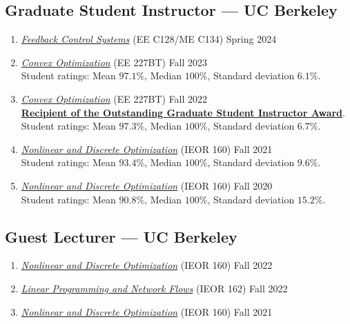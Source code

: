 \documentclass[11pt]{article}
\newcommand{\subsectionskip}{\baselineskip}	%
\newcommand{\cvdate}[1]{\hfill#1}			%
\begin{document}
	\subsection{Graduate Student Instructor --- UC Berkeley}
	\begin{enumerate}[label={\arabic*.}]
		\item \href{https://people.eecs.berkeley.edu/~sojoudi/Course_EE128_SP_2024.html}{\textit{Feedback Control Systems}} (EE C128/ME C134) \cvdate{Spring 2024}
		\item \href{https://classes.berkeley.edu/content/2023-fall-eleng-227bt-001-lec-001}{\textit{Convex Optimization}} (EE 227BT) \cvdate{Fall 2023} \\
		Student ratings: Mean $97.1\%$, Median $100\%$, Standard deviation $6.1\%$.
		\item \href{https://classes.berkeley.edu/content/2022-fall-eleng-227bt-001-lec-001}{\textit{Convex Optimization}} (EE 227BT) \cvdate{Fall 2022} \\
		\textbf{\href{https://gsi.berkeley.edu/programs-services/award-programs/ogsi/ogsi-recipients-2022-2023/}{Recipient of the Outstanding Graduate Student Instructor Award}}. \\
		Student ratings: Mean $97.3\%$, Median $100\%$, Standard deviation $6.7\%$.
		\item \href{https://lavaei.ieor.berkeley.edu/Course_IEOR160_Fall_2021.html}{\textit{Nonlinear and Discrete Optimization}} (IEOR 160) \cvdate{Fall 2021} \\
		Student ratings: Mean $93.4\%$, Median $100\%$, Standard deviation $9.6\%$.
		\item \href{https://lavaei.ieor.berkeley.edu/Course_IEOR160_Fall_2020.html}{\textit{Nonlinear and Discrete Optimization}} (IEOR 160) \cvdate{Fall 2020} \\
		Student ratings: Mean $90.8\%$, Median $100\%$, Standard deviation $15.2\%$.
	\end{enumerate}
	
	\vspace*{\subsectionskip}

	\subsection{Guest Lecturer --- UC Berkeley}

	\begin{enumerate}[label={\arabic*.}]
		\item \href{https://lavaei.ieor.berkeley.edu/Course_IEOR160_Fall_2022.html}{\textit{Nonlinear and Discrete Optimization}} (IEOR 160) \cvdate{Fall 2022}
		\item \href{https://lavaei.ieor.berkeley.edu/Course_IEOR162_Fall_2022.html}{\textit{Linear Programming and Network Flows}} (IEOR 162) \cvdate{Fall 2022}
		\item \href{https://lavaei.ieor.berkeley.edu/Course_IEOR160_Fall_2021.html}{\textit{Nonlinear and Discrete Optimization}} (IEOR 160) \cvdate{Fall 2021}
	\end{enumerate}
\end{document}
